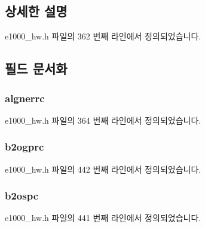 \subsection{상세한 설명}


e1000\+\_\+hw.\+h 파일의 362 번째 라인에서 정의되었습니다.



\subsection{필드 문서화}
\subsubsection[{\texorpdfstring{algnerrc}{algnerrc}}]{ algnerrc}\hypertarget{structe1000__hw__stats_a0ca53edc7a4bef7b9d747c4258a34dfa}{}\label{structe1000__hw__stats_a0ca53edc7a4bef7b9d747c4258a34dfa}


e1000\+\_\+hw.\+h 파일의 364 번째 라인에서 정의되었습니다.

\subsubsection[{\texorpdfstring{b2ogprc}{b2ogprc}}]{ b2ogprc}\hypertarget{structe1000__hw__stats_a8ca8501632611b4de9beb7d7419f1591}{}\label{structe1000__hw__stats_a8ca8501632611b4de9beb7d7419f1591}


e1000\+\_\+hw.\+h 파일의 442 번째 라인에서 정의되었습니다.

\subsubsection[{\texorpdfstring{b2ospc}{b2ospc}}]{ b2ospc}\hypertarget{structe1000__hw__stats_ac5cab6fb343563ff630864882a71f0b0}{}\label{structe1000__hw__stats_ac5cab6fb343563ff630864882a71f0b0}


e1000\+\_\+hw.\+h 파일의 441 번째 라인에서 정의되었습니다.

